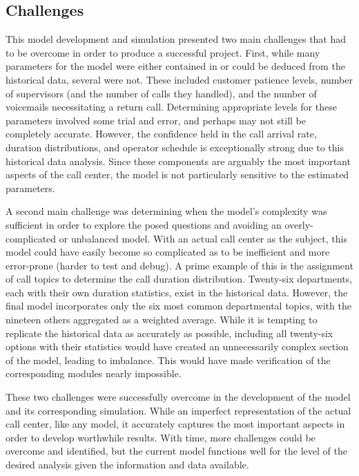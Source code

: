 \documentclass[12pt,twocolumn]{article}
\begin{document}
	\subsection{Challenges}

	This model development and simulation presented two main challenges that had to be overcome in order to produce a successful project.  First, while many parameters for the model were either contained in or could be deduced from the historical data, several were not.  These included customer patience levels, number of supervisors (and the number of calls they handled), and the number of voicemails necessitating a return call.  Determining appropriate levels for these parameters involved some trial and error, and perhaps may not still be completely accurate.  However, the confidence held in the call arrival rate, duration distributions, and operator schedule is exceptionally strong due to this historical data analysis.  Since these components are arguably the most important aspects of the call center, the model is not particularly sensitive to the estimated parameters.
	
	\par
	
	A second main challenge was determining when the model's complexity was sufficient in order to explore the posed questions and avoiding an overly-complicated or unbalanced model.  With an actual call center as the subject, this model could have easily become so complicated as to be inefficient and more error-prone (harder to test and debug).  A prime example of this is the assignment of call topics to determine the call duration distribution.  Twenty-six departments, each with their own duration statistics, exist in the historical data.  However, the final model incorporates only the six most common departmental topics, with the nineteen others aggregated as a weighted average.  While it is tempting to replicate the historical data as accurately as possible, including all twenty-six options with their statistics would have created an unnecessarily complex section of the model, leading to imbalance.  This would have made verification of the corresponding modules nearly impossible.
	
	\par
	
	These two challenges were successfully overcome in the development of the model and its corresponding simulation.  While an imperfect representation of the actual call center, like any model, it accurately captures the most important aspects in order to develop worthwhile results.  With time, more challenges could be overcome and identified, but the current model functions well for the level of the desired analysis given the information and data available.
\end{document}
